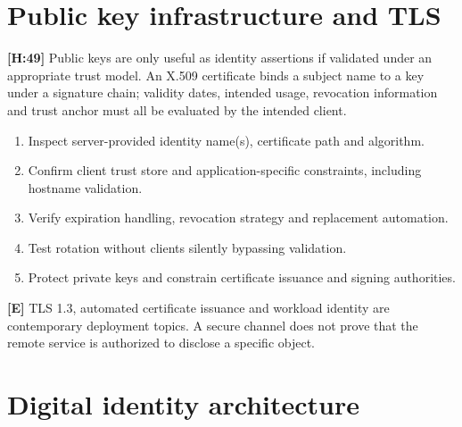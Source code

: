\documentclass[10pt,letterpaper,oneside]{article}
\newcommand{\handbookref}[1]{\textsf{\color{accent}\textbf{[H:#1]}}}
\newcommand{\modernext}{\textsf{\color{muted}\textbf{[E]}}}
\begin{document}
\section{Public key infrastructure and TLS}
\handbookref{49} Public keys are only useful as identity assertions if validated under an appropriate trust model. An X.509 certificate binds a subject name to a key under a signature chain; validity dates, intended usage, revocation information and trust anchor must all be evaluated by the intended client.
\begin{enumerate}
\item Inspect server-provided identity name(s), certificate path and algorithm.
\item Confirm client trust store and application-specific constraints, including hostname validation.
\item Verify expiration handling, revocation strategy and replacement automation.
\item Test rotation without clients silently bypassing validation.
\item Protect private keys and constrain certificate issuance and signing authorities.
\end{enumerate}
\modernext{} TLS 1.3, automated certificate issuance and workload identity are contemporary deployment topics. A secure channel does not prove that the remote service is authorized to disclose a specific object.

\section{Digital identity architecture}
\end{document}
